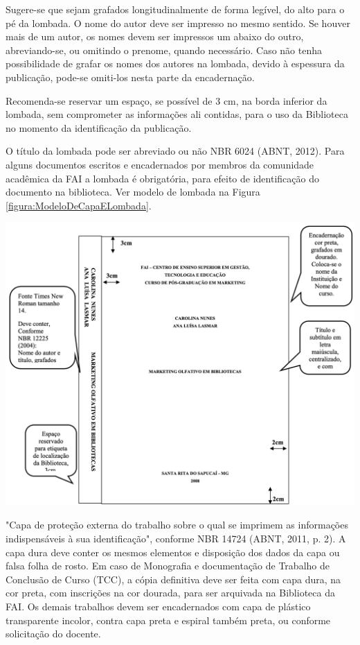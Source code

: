 \begin{Desenvolvimento}
Sugere-se que sejam grafados longitudinalmente de forma legível, do alto para o pé da lombada.
O nome do autor deve ser impresso no mesmo sentido. Se houver mais de um autor, os nomes devem ser impressos um abaixo do outro, abreviando-se, ou omitindo o prenome, quando necessário. Caso não tenha possibilidade de grafar os nomes dos autores na lombada, devido à espessura da publicação, pode-se omiti-los nesta parte da encadernação.

Recomenda-se reservar um espaço, se possível de 3 cm, na borda inferior da lombada, sem comprometer as informações ali contidas, para o uso da Biblioteca no momento da identificação da publicação.

O título da lombada pode ser abreviado ou não NBR 6024 (ABNT, 2012). Para alguns documentos escritos e encadernados por membros da comunidade acadêmica da FAI a lombada é obrigatória, para efeito de identificação do documento na biblioteca. Ver modelo de lombada na Figura \ref{figura:ModeloDeCapaELombada}.

\begin{figura}[h!]
  \centering
  \addfigura
  \includegraphics[width=1\textwidth]{ilustracoes/figuras/Modelo de Capa e Lombada.png}
  \label{figura:ModeloDeCapaELombada}
\end{figura}

"Capa de proteção externa do trabalho sobre o qual se imprimem as informações indispensáveis à sua identificação", conforme NBR 14724 (ABNT, 2011, p. 2). A capa dura deve conter os mesmos elementos e disposição dos dados da capa ou falsa folha de rosto. Em caso de Monografia e documentação de Trabalho de Conclusão de Curso (TCC), a cópia definitiva deve ser feita com capa dura, na cor preta, com inscrições na cor dourada, para ser arquivada na Biblioteca da FAI. Os demais trabalhos devem ser encadernados com capa de plástico transparente incolor, contra capa preta e espiral também preta, ou conforme solicitação do docente.


\end{Desenvolvimento}
